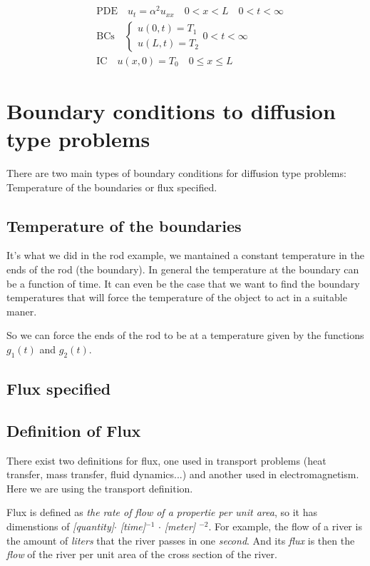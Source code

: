 \documentclass[../pde.tex]{subfiles}
\begin{document}
    \begin{align*}
        &\text{PDE} \quad u_{t} = \alpha^2 u_{xx} \quad 0<x<L \quad 0<t<\infty \\[1em]
        &\text{BCs} \quad 
        \begin{cases}
            u(0,t) = T_1\\
            u(L,t) = T_2
        \end{cases} 
        0< t<\infty \\[1em]
        &\text{IC} \quad u(x,0) = T_0 \quad 0\le x \le L
    \end{align*}


    \section{\sffamily Boundary conditions to diffusion type problems}
    
    There are two main types of boundary conditions for diffusion type problems: Temperature of the boundaries or flux specified. 
    \subsection{\sffamily Temperature of the boundaries}
    It's what we did in the rod example, we mantained a constant temperature in the ends of the rod (the boundary). In general the
    temperature at the boundary can be a function of time. It can even be the case that we want to find the boundary
    temperatures that will force the temperature of the object to act in a suitable maner. 

    So we can force the ends of the rod to be at a temperature given by the functions $g_{1}(t)$ and $g_{2}(t)$.

    \subsection{\sffamily Flux specified}
    
    \subsection{\sffamily Definition of Flux}
    There exist two definitions for flux, one used in transport problems (heat transfer, mass transfer, fluid dynamics...) and
    another used in electromagnetism. Here we are using the transport definition.

    Flux is defined as \emph{the rate of flow of a propertie per unit area}, so it has dimenstions of \emph{[quantity]}$\cdot$
    \emph{[time]$^{-1}$} $\cdot$ \emph{[meter] $^{-2}$}. For example, the flow of a river is the amount of \emph{liters} that
    the river passes in one \emph{second}. And its \emph{flux} is then the \emph{flow} of the river per unit area of the cross
    section of the river. 
\end{document}
